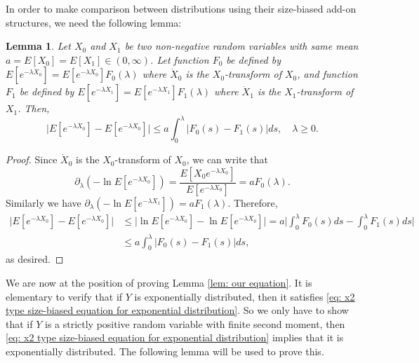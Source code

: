 \documentclass[12pt,a4paper]{amsart}
\newtheorem{lem}[thm]{Lemma}
\numberwithin{equation}{section}
\begin{document}
In order to make comparison between distributions using their size-biased add-on structures, we need the following lemma:
\begin{lem}\label{lem: compare}
	Let $X_0$ and $X_1$ be two non-negative random variables with same mean $a = E[X_0] = E[X_1] \in (0,\infty)$. 
	Let function $F_0$ be defined by $E[e^{-\lambda \dot X_0}] = E[e^{-\lambda X_0}] F_0(\lambda)$ where $\dot X_0$ is the $X_0$-transform of $X_0$,
	and function $F_1$ be defined by $E[e^{-\lambda \dot X_1}] = E[e^{-\lambda X_1}] F_1(\lambda)$ where $\dot X_1$ is the $X_1$-transform of $X_1$. 
	Then,
	\[
	\big| E[e^{-\lambda X_0}] - E[e^{-\lambda X_0}] \big| \leq a \int_0^\lambda| F_0(s) - F_1(s) |ds, \quad \lambda \geq 0.
	\]
\end{lem}
\begin{proof}
	Since $\dot X_0$ is the $X_0$-transform of $X_0$, we can write that
	\[
	\partial_\lambda ( -\ln E[e^{-\lambda X_0}]) = \frac { E[X_0 e^{-\lambda X_0}]}{ E[e^{-\lambda X_0}] }
	= a F_0(\lambda).
	\]
	Similarly we have $\partial_\lambda ( -\ln E[e^{-\lambda X_1}]) = a F_1(\lambda)$. 
	Therefore,
	\[\begin{split}
	\big| E[e^{-\lambda X_0}] - E[e^{-\lambda X_0}] \big|
	&\leq \big| \ln E[e^{-\lambda X_0}] - \ln E[e^{-\lambda X_0}] \big|
	= a\big| \int_0^\lambda F_0(s)ds - \int_0^\lambda F_1(s)ds \big|
	\\& \leq a \int_0^\lambda| F_0(s) - F_1(s) |ds, 
	\end{split}\]
	as desired.
\end{proof}


	We are now at the position of proving Lemma \ref{lem: our equation}.
	It is elementary to verify that if $Y$ is exponentially distributed, then it satisfies \eqref{eq: x2 type size-biased equation for exponential distribution}.
	So we only have to show that if $Y$ is a strictly positive random variable with finite second moment, then \eqref{eq: x2 type size-biased equation for exponential distribution} implies that it is exponentially distributed.
	The following lemma will be used to prove this.
\end{document}
